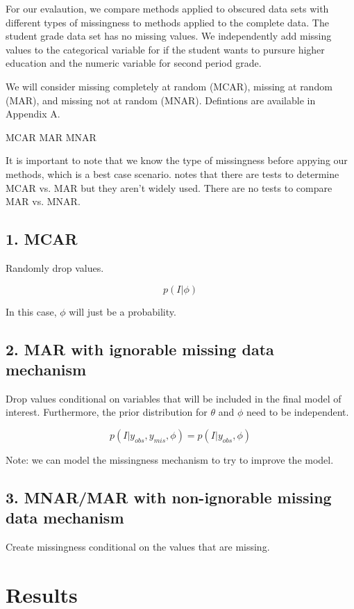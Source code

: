 \documentclass[11pt]{article}
\begin{document}
For our evalaution, we compare methods applied to obscured data sets with different types of missingness to methods applied to the complete data. The student grade data set has no missing values. We independently add missing values to the categorical variable for if the student wants to pursure higher education and the numeric variable for second period grade. 

We will consider missing completely at random (MCAR), missing at random (MAR), and missing not at random (MNAR). Defintions are available in Appendix A. 

MCAR
MAR
MNAR

It is important to note that we know the type of missingness before appying our methods, which is a best case scenario. \cite{vanBurren2018} notes that there are tests to determine MCAR vs. MAR but they aren't widely used. There are no tests to compare MAR vs. MNAR.

\subsection{1. MCAR}

Randomly drop values. 

$$p(I| \phi)$$

In this case, $\phi$ will just be a probability.

\subsection{2. MAR with ignorable missing data mechanism}

Drop values conditional on variables that will be included in the final model of interest. Furthermore, the prior distribution for $\theta$ and $\phi$ need to be independent. 

$$p(I|y_{obs}, y_{mis}, \phi) = p(I|y_{obs}, \phi)$$

Note: we can model the missingness mechanism to try to improve the model.

\subsection{3. MNAR/MAR with non-ignorable missing data mechanism}

Create missingness conditional on the values that are missing. 


\section{Results}
\end{document}
